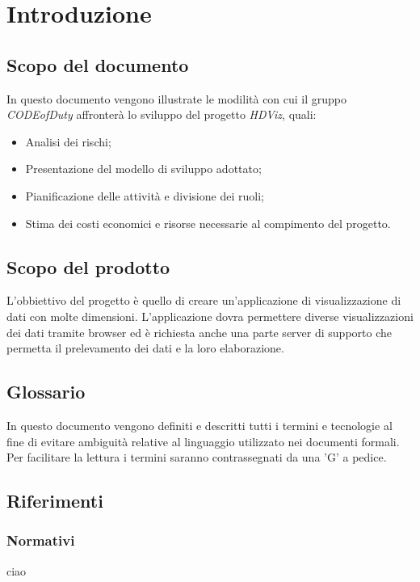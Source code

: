 \section{Introduzione}
\subsection{Scopo del documento}
	In questo documento vengono illustrate le modilità con cui il gruppo \emph{CODEofDuty} affronterà lo sviluppo del progetto \emph{HDViz}, quali:
	\begin{itemize}
    		\item Analisi dei rischi;
    		\item Presentazione del modello di sviluppo adottato;
    		\item Pianificazione delle attività e divisione dei ruoli;
    		\item Stima dei costi economici e risorse necessarie al compimento del progetto.
	\end{itemize}
\subsection{Scopo del prodotto}
	L'obbiettivo del progetto è quello di creare un'applicazione di visualizzazione di dati con molte dimensioni. L'applicazione dovra permettere diverse visualizzazioni dei dati tramite browser ed è richiesta anche una parte server di supporto che permetta il prelevamento dei dati e la loro elaborazione.
\subsection{Glossario}
	In questo documento vengono definiti e descritti tutti i termini e tecnologie al fine di evitare ambiguità relative al linguaggio utilizzato nei documenti formali. Per facilitare la lettura i termini saranno contrassegnati da una 'G' a pedice.  
\subsection{Riferimenti}
	\subsubsection{Normativi}
		ciao
